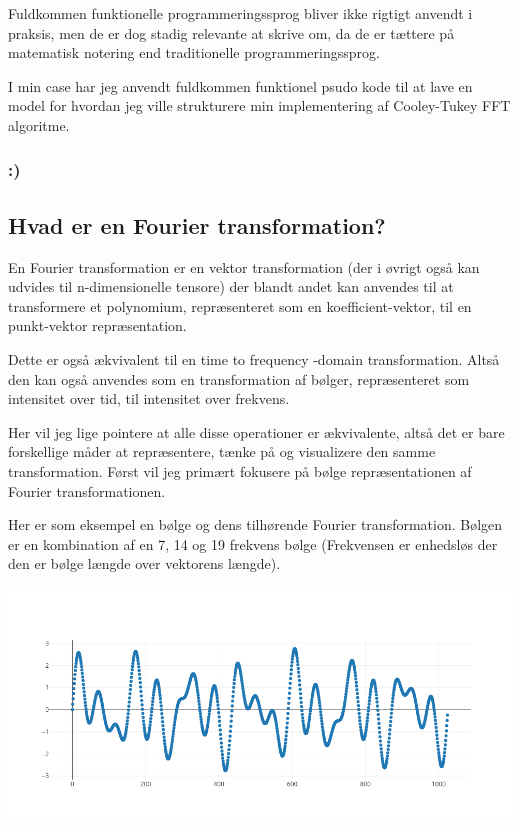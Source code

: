 \documentclass[11pt,a4paper]{article}
\begin{document}
Fuldkommen funktionelle programmeringssprog bliver ikke rigtigt anvendt i praksis,
men de er dog stadig relevante at skrive om, da de er tættere på matematisk notering
end traditionelle programmeringssprog.

I min case har jeg anvendt fuldkommen funktionel psudo kode til at lave en model
for hvordan jeg ville strukturere min implementering af Cooley-Tukey FFT algoritme.

\subsubsection{:)}
\label{sec:orga78afe1}
\newpage

\subsection{Hvad er en Fourier transformation?}
\label{sec:org0b8030f}

En Fourier transformation er en vektor transformation (der i øvrigt også kan udvides til n-dimensionelle tensore)
der blandt andet kan anvendes til at transformere et polynomium,
repræsenteret som en koefficient-vektor, til en punkt-vektor repræsentation.

Dette er også ækvivalent til en time to frequency -domain transformation.
Altså den kan også anvendes som en transformation af bølger, repræsenteret som intensitet over tid, til intensitet over frekvens.

Her vil jeg lige pointere at alle disse operationer er ækvivalente, altså det er bare forskellige måder at repræsentere, tænke på og visualizere den samme transformation.
Først vil jeg primært fokusere på bølge repræsentationen af Fourier transformationen.

\bigskip

Her er som eksempel en bølge og dens tilhørende Fourier transformation.
Bølgen er en kombination af en 7, 14 og 19 frekvens bølge (Frekvensen er enhedsløs der den er bølge længde over vektorens længde).

\begin{center}
\includegraphics[width=.9\linewidth]{./source_plot2.png}
\end{center}
\end{document}
